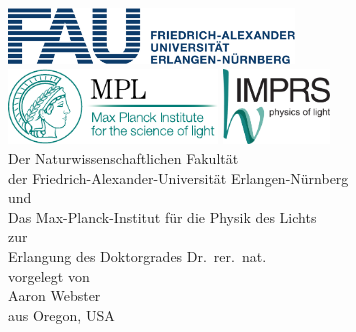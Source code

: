 \begin{titlepage}
\begin{center}
\hfill\\[2cm]
{\Huge {\bfseries \textsc {\distitle}} \par}
\vspace{3.0cm}
\includegraphics[height=1.5cm,keepaspectratio]{images/FAU_cmyk}\\
\vspace{1cm}
\includegraphics[height=2cm,keepaspectratio]{images/Logo_MPL_englisch_kompakt_cmyk_110915}
\hspace{1cm}
\includegraphics[height=2cm,keepaspectratio]{images/Logo_IMPRS_4c_042012}
\vspace{3cm}
\\
{\large
Der Naturwissenschaftlichen Fakultät\\
der Friedrich-Alexander-Universität Erlangen-Nürnberg\\
und\\
Das Max-Planck-Institut für die Physik des Lichts\\
\vspace{0.5cm}
zur\\
Erlangung des Doktorgrades Dr.\ rer.\ nat.\ \\
\vspace{0.5cm}
vorgelegt von\\
Aaron Webster\\
aus Oregon, USA
}
\end{center}
\end{titlepage}

